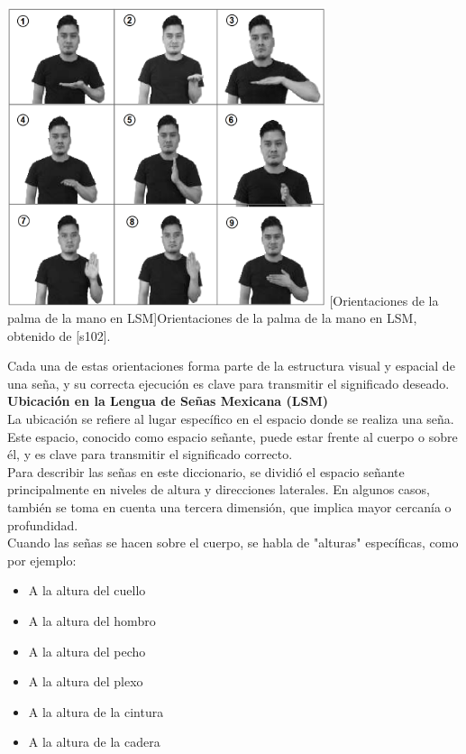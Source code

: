 \begin{center}
    \includegraphics[width=0.7\textwidth]{Images/Cap 2/Orientacion_Palma_Mano.png}
    [Orientaciones de la palma de la mano en LSM]{Orientaciones de la palma de la mano en LSM, obtenido de [s102].}  %
\end{center}

Cada una de estas orientaciones forma parte de la estructura visual y espacial de una seña, y su correcta ejecución es clave para transmitir el significado deseado.\\

\textbf{Ubicación en la Lengua de Señas Mexicana (LSM)}\\
La ubicación se refiere al lugar específico en el espacio donde se realiza una seña. Este espacio, conocido como espacio señante, puede estar frente al cuerpo o sobre él, y es clave para transmitir el significado correcto.\\

Para describir las señas en este diccionario, se dividió el espacio señante principalmente en niveles de altura y direcciones laterales. En algunos casos, también se toma en cuenta una tercera dimensión, que implica mayor cercanía o profundidad.\\

Cuando las señas se hacen sobre el cuerpo, se habla de "alturas" específicas, como por ejemplo:
\begin{itemize}
    \item A la altura del cuello
    \item A la altura del hombro
    \item A la altura del pecho
    \item A la altura del plexo
    \item A la altura de la cintura
    \item A la altura de la cadera
\end{itemize}

